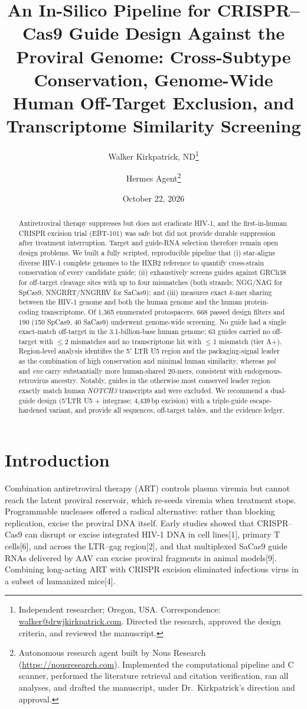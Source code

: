 \documentclass[11pt]{article}
\title{An In-Silico Pipeline for CRISPR--Cas9 Guide Design Against the \HH{}
  Proviral Genome: Cross-Subtype Conservation, Genome-Wide Human Off-Target
  Exclusion, and Transcriptome Similarity Screening}
\author{Walker Kirkpatrick, ND\thanks{Independent researcher; Oregon, USA.
  Correspondence: \url{walker@drwjkirkpatrick.com}. Directed the research,
  approved the design criteria, and reviewed the manuscript.}
  \and Hermes Agent\thanks{Autonomous research agent built by Nous Research
  (\url{https://nousresearch.com}). Implemented the computational pipeline
  and C scanner, performed the literature retrieval and citation
  verification, ran all analyses, and drafted the manuscript, under Dr.\
  Kirkpatrick's direction and approval.}}
\date{October 22, 2026}
\newcommand{\src}[1]{[#1]}
\newcommand{\HH}{HIV-1}
\begin{document}
\maketitle

\begin{abstract}
Antiretroviral therapy suppresses but does not eradicate HIV-1, and the
first-in-human CRISPR excision trial (EBT-101) was safe but did not provide
durable suppression after treatment interruption. Target and guide-RNA
selection therefore remain open design problems. We built a fully scripted,
reproducible pipeline that (i) star-aligns \nstrains{} diverse HIV-1 complete
genomes to the HXB2 reference to quantify cross-strain conservation of every
candidate guide; (ii) exhaustively screens guides against GRCh38 for
off-target cleavage sites with up to four mismatches (both strands; NGG/NAG
for SpCas9, NNGRRT/NNGRRV for SaCas9); and (iii) measures exact $k$-mer
sharing between the \HH{} genome and both the human genome and the human
protein-coding transcriptome. Of 1,365 enumerated protospacers, 668 passed
design filters and 190 (150 SpCas9, 40 SaCas9) underwent genome-wide
screening. No guide had a single exact-match off-target in the 3.1-billion-base
human genome; 63 guides carried no off-target with $\le$2 mismatches and no
transcriptome hit with $\le$1 mismatch (tier A+). Region-level analysis
identifies the 5$'$ LTR U5 region and the packaging-signal leader as the
combination of high conservation and minimal human similarity, whereas
\emph{pol} and \emph{env} carry substantially more human-shared 20-mers,
consistent with endogenous-retrovirus ancestry. Notably, guides in the
otherwise most conserved leader region exactly match human \emph{NOTCH3}
transcripts and were excluded. We recommend a dual-guide design (5$'$LTR U5 +
integrase; 4,439\,bp excision) with a triple-guide escape-hardened variant,
and provide all sequences, off-target tables, and the evidence ledger.
\end{abstract}

\section{Introduction}

Combination antiretroviral therapy (ART) controls plasma viremia but cannot
reach the latent proviral reservoir, which re-seeds viremia when treatment
stops. Programmable nucleases offered a radical alternative: rather than
blocking replication, excise the proviral DNA itself. Early studies showed
that CRISPR--Cas9 can disrupt or excise integrated \HH{} DNA in cell
lines\src{1}, primary T cells\src{6}, and across the LTR--gag
region\src{2}, and that multiplexed SaCas9 guide RNAs delivered by AAV can
excise proviral fragments in animal models\src{9}. Combining long-acting
ART with CRISPR excision eliminated infectious virus in a subset of
humanized mice\src{4}.
\end{document}
